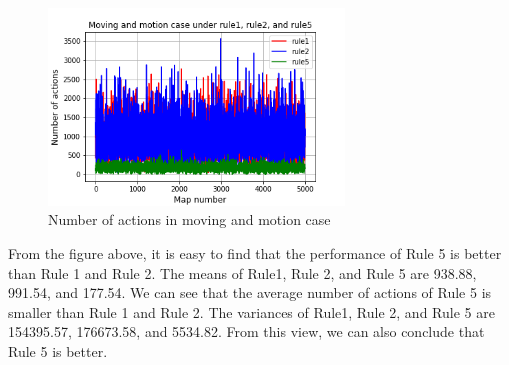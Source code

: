 \documentclass[letter]{article}
\begin{document}
	
	\begin{figure}[H]
		\centering
		\includegraphics[width=0.7\textwidth]{fig/part2-last.png}
		\caption{Number of actions in moving and motion case}
		\label{fig:part2-last.png}
	\end{figure}
	
	From the figure above, it is easy to find that the performance of Rule 5 is better than Rule 1 and Rule 2. The means of Rule1, Rule 2, and Rule 5 are 938.88, 991.54, and 177.54.
	We can see that the average number of actions of Rule 5 is smaller than Rule 1 and Rule 2. The variances of Rule1, Rule 2, and Rule 5 are 154395.57, 176673.58, and 5534.82.
	From this view, we can also conclude that Rule 5 is better.
	
\end{document}
